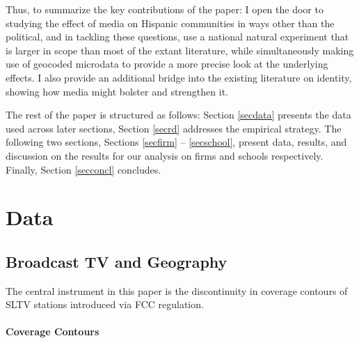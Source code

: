 \documentclass[11pt]{article}
\begin{document}
Thus, to summarize the key contributions of the paper: I open the door to studying the effect of media on Hispanic communities in ways other than the political, and in tackling these questions, use a national natural experiment that is larger in scope than most of the extant literature, while simultaneously making use of geocoded microdata to provide a more precise look at the underlying effects. I also provide an additional bridge into the existing literature on identity, showing how media might bolster and strengthen it.





The rest of the paper is structured as follows: Section \ref{secdata} presents the data used across later sections, Section \ref{secrd} addresses the empirical strategy. The following two sections, Sections \ref{secfirm} -- \ref{secschool}, present data, results, and discussion on the results for our analysis on firms and schools respectively. Finally, Section \ref{secconcl} concludes.


\section{Data}\label{s:data}


\subsection{Broadcast TV and Geography}

The central instrument in this paper is the discontinuity in coverage contours of SLTV stations introduced via FCC regulation.

\paragraph{Coverage Contours} 
\end{document}
